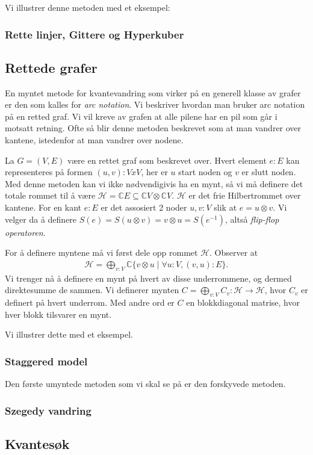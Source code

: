         Vi illustrer denne metoden med et eksempel: 

    \subsubsection*{Rette linjer, Gittere og Hyperkuber} %

    \subsection*{Rettede grafer}

        En myntet metode for kvantevandring som virker på en generell klasse av grafer er den som kalles for \emph{arc notation}. Vi beskriver hvordan man bruker arc notation på en retted graf. Vi vil kreve av grafen at alle pilene har en pil som går i motsatt retning. Ofte så blir denne metoden beskrevet som at man vandrer over kantene, istedenfor at man vandrer over nodene.

        La $G=(V,E)$ være en rettet graf som beskrevet over. Hvert element $e:E$ kan representeres på formen $(u,v):VxV$, her er $u$ start noden og $v$ er slutt noden. Med denne metoden kan vi ikke nødvendigivis ha en mynt, så vi må definere det totale rommet til å være $\mathcal{H}=\mathbb{C}E \subseteq \mathbb{C}V\otimes\mathbb{C}V$. $\mathcal{H}$ er det frie Hilbertrommet over kantene. For en kant $e:E$ er det assosiert 2 noder $u,v:V$ slik at $e=u\otimes v$. Vi velger da å definere $S(e)=S(u\otimes v)=v\otimes u = S(e^{-1})$, altså \emph{flip-flop operatoren}. 

        For å definere myntene må vi først dele opp rommet $\mathcal{H}$. Observer at 
        \begin{align*}
            \mathcal{H}=\bigoplus_{v:V}\mathbb{C}\{v\otimes u\mid \forall u:V,(v,u):E\}.
        \end{align*}
        Vi trenger nå å definere en mynt på hvert av disse underrommene, og dermed direktesumme de sammen. Vi definerer mynten $C = \bigoplus_{v:V}C_v:\mathcal{H}\rightarrow\mathcal{H}$, hvor $C_v$ er definert på hvert underrom. Med andre ord er $C$ en blokkdiagonal matrise, hvor hver blokk tilsvarer en mynt.

        Vi illustrer dette med et eksempel.

    \subsubsection*{Staggered model} %

        Den første umyntede metoden som vi skal se på er den forskyvede metoden. 

    \subsubsection*{Szegedy vandring}

\subsection{Kvantesøk}